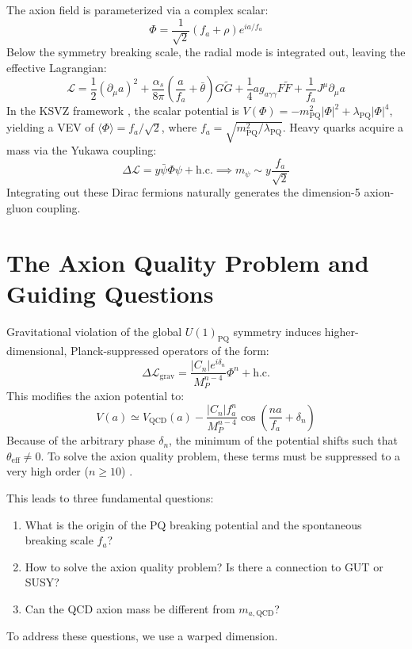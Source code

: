 \documentclass[11pt]{article}
\begin{document}
The axion field is parameterized via a complex scalar:
\begin{equation}
    \Phi = \frac{1}{\sqrt{2}}(f_a + \rho) e^{i a / f_a}
\end{equation}
Below the symmetry breaking scale, the radial mode is integrated out, leaving the effective Lagrangian:
\begin{equation}
    \mathcal{L} = \frac{1}{2}(\partial_\mu a)^2 + \frac{\alpha_s}{8\pi} \left(\frac{a}{f_a} + \bar{\theta}\right) G\tilde{G} + \frac{1}{4} a g_{a\gamma\gamma} F\tilde{F} + \frac{1}{f_a} J^\mu \partial_\mu a
\end{equation}
In the KSVZ framework \cite{kim1979, shifman1980}, the scalar potential is $V(\Phi) = -m_{\text{PQ}}^2 |\Phi|^2 + \lambda_{\text{PQ}} |\Phi|^4$, yielding a VEV of $\langle \Phi \rangle = f_a / \sqrt{2}$, where $f_a = \sqrt{m_{\text{PQ}}^2 / \lambda_{\text{PQ}}}$. Heavy quarks acquire a mass via the Yukawa coupling:
\begin{equation}
    \Delta \mathcal{L} = y \bar{\psi} \Phi \psi + \text{h.c.} \implies m_\psi \sim y \frac{f_a}{\sqrt{2}}
\end{equation}
Integrating out these Dirac fermions naturally generates the dimension-5 axion-gluon coupling. 

\section{The Axion Quality Problem and Guiding Questions}
Gravitational violation of the global $U(1)_{\text{PQ}}$ symmetry induces higher-dimensional, Planck-suppressed operators of the form:
\begin{equation}
    \Delta \mathcal{L}_{\text{grav}} = \frac{|C_n| e^{i\delta_n}}{M_P^{n-4}} \Phi^n + \text{h.c.}
\end{equation}
This modifies the axion potential to:
\begin{equation}
    V(a) \simeq V_{\text{QCD}}(a) - \frac{|C_n| f_a^n}{M_P^{n-4}} \cos\left(\frac{n a}{f_a} + \delta_n\right)
\end{equation}
Because of the arbitrary phase $\delta_n$, the minimum of the potential shifts such that $\theta_{\text{eff}} \neq 0$. To solve the axion quality problem, these terms must be suppressed to a very high order ($n \ge 10$) \cite{randall1992, dobrescu1996, cheng2001}. 

This leads to three fundamental questions:
\begin{enumerate}
    \item What is the origin of the PQ breaking potential and the spontaneous breaking scale $f_a$?
    \item How to solve the axion quality problem? Is there a connection to GUT or SUSY?
    \item Can the QCD axion mass be different from $m_{a,\text{QCD}}$?
\end{enumerate}
To address these questions, we use a warped dimension.
\end{document}

